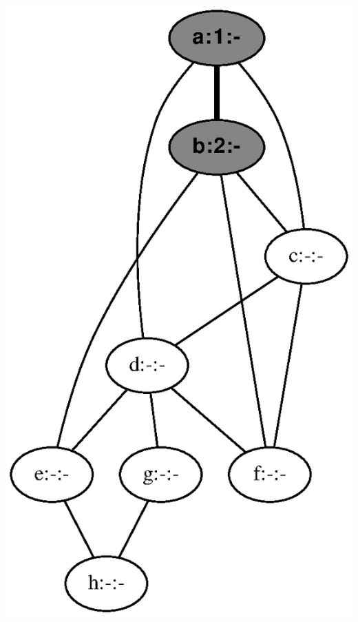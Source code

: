 \documentclass{article}
\begin{document}
\vspace{1em}
\includegraphics[height=.3\textheight]{dfs_undirected_classroom_02.eps}
\vspace{1em}
\end{document}
